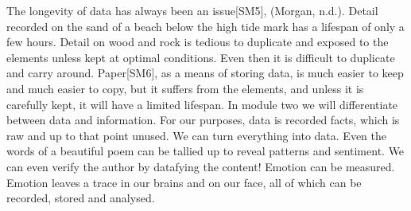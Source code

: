\documentclass{book}
\begin{document}
The longevity of data has always been an issue[SM5], (Morgan, n.d.).  Detail recorded on the sand of a beach below the high tide mark has a lifespan of only a few hours.  Detail on wood and rock is tedious to duplicate and exposed to the elements unless kept at optimal conditions.  Even then it is difficult to duplicate and carry around.  Paper[SM6], as a means of storing data, is much easier to keep and much easier to copy, but it suffers from the elements, and unless it is carefully kept, it will have a limited lifespan.  In module two we will differentiate between data and information. For our purposes, data is recorded facts, which is raw and up to that point unused.
We can turn everything into data.  Even the words of a beautiful poem can be tallied up to reveal patterns and sentiment.  We can even verify the author by datafying the content!  Emotion can be measured.  Emotion leaves a trace in our brains and on our face, all of which can be recorded, stored and analysed.
\end{document}
